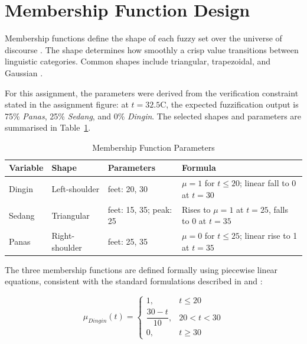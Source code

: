 \documentclass{article}
\begin{document}
\section*{Membership Function Design}

Membership functions define the shape of each fuzzy set over the universe of
discourse \cite{ross2016fuzzy}. The shape determines how smoothly a crisp value
transitions between linguistic categories. Common shapes include triangular,
trapezoidal, and Gaussian \cite{yen1999fuzzy}.

For this assignment, the parameters were derived from the verification constraint
stated in the assignment figure: at $t = 32.5$\textdegree C, the expected
fuzzification output is 75\% \textit{Panas}, 25\% \textit{Sedang}, and 0\%
\textit{Dingin}. The selected shapes and parameters are summarised in
Table~\ref{tab:mf_params}.

\begin{table}[htbp]
\centering
\caption{Membership Function Parameters}
\begin{tabular}{llll}
\hline
\textbf{Variable} & \textbf{Shape} & \textbf{Parameters} & \textbf{Formula} \\ \hline
Dingin & Left-shoulder  & feet: 20, 30            & $\mu = 1$ for $t \leq 20$; linear fall to 0 at $t = 30$ \\
Sedang & Triangular     & feet: 15, 35; peak: 25  & Rises to $\mu=1$ at $t=25$, falls to 0 at $t=35$       \\
Panas  & Right-shoulder & feet: 25, 35            & $\mu = 0$ for $t \leq 25$; linear rise to 1 at $t = 35$ \\ \hline
\end{tabular}
\label{tab:mf_params}
\end{table}

The three membership functions are defined formally using piecewise linear
equations, consistent with the standard formulations described in
\cite{ross2016fuzzy} and \cite{yen1999fuzzy}:

\begin{equation}
\mu_{Dingin}(t) =
\begin{cases}
    1,                      & t \leq 20 \\
    \dfrac{30 - t}{10},     & 20 < t < 30 \\
    0,                      & t \geq 30
\end{cases}
\end{equation}
\end{document}
